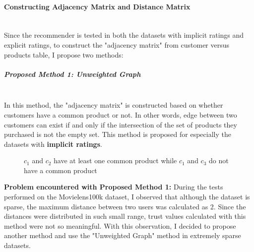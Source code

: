 	\paragraph{Constructing Adjacency Matrix and Distance Matrix}\mbox{}\\
	Since the recommender is tested in both the datasets with implicit ratings and explicit ratings, to construct the "adjacency matrix" from customer versus products table, I propose two methods: 
	\subparagraph{Proposed Method 1: Unweighted Graph}\mbox{}\\
	\label{prop_method_1}
	In this method, the "adjacency matrix" is constructed based on whether customers have a common product or not. In other words, edge between two customers can exist if and only if the intersection of the set of products they purchased is not the empty set. This method is proposed for especially the datasets with \textbf{implicit ratings}.
	\begin{figure}[H]
		\centering
		\caption{$c_{1}$ and $c_{2}$ have at least one common product while $c_{1}$ and $c_{3}$ do not have a common product}
	\end{figure}

	\textbf{Problem encountered with Proposed Method 1:} During the tests performed on the Movielens100k dataset, I observed that although the dataset is sparse, the maximum distance between two users was calculated as 2. Since the distances were distributed in such small range, trust values calculated with this method were not so meaningful. With this observation, I decided to propose another method and use the "Unweighted Graph" method in extremely sparse datasets.
	
